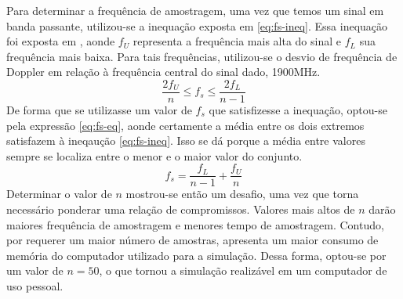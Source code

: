 \documentclass[journal,11pt,twocolumn]{IEEEtran}
\begin{document}
Para determinar a frequência de amostragem, uma vez que temos um sinal em banda passante, utilizou-se a inequação exposta em \ref{eq:fs-ineq}. Essa inequação foi exposta em \cite{bandpass}, aonde $f_{U}$ representa a frequência mais alta do sinal e $f_{L}$ sua frequência mais baixa. Para tais frequências, utilizou-se o desvio de frequência de Doppler em relação à frequência central do sinal dado, 1900MHz.
\begin{equation}
    \frac{2f_{U}}{n} \leq f_{s}\leq \frac{2f_{L}}{n-1}
    \label{eq:fs-ineq}
\end{equation}
De forma que se utilizasse um valor de $f_{s}$ que satisfizesse a inequação, optou-se pela expressão \ref{eq:fs-eq}, aonde certamente a média entre os dois extremos satisfazem à ineqaução \ref{eq:fs-ineq}. Isso se dá porque a média entre valores sempre se localiza entre o menor e o maior valor do conjunto.
\begin{equation}
     f_{s} = \frac{f_{L}}{n-1} + \frac{f_{U}}{n}
    \label{eq:fs-eq}    
\end{equation}
Determinar o valor de $n$ mostrou-se então um desafio, uma vez que torna necessário ponderar uma relação de compromissos. Valores mais altos de $n$ darão maiores frequência de amostragem e menores tempo de amostragem. Contudo, por requerer um maior número de amostras, apresenta um maior consumo de memória do computador utilizado para a simulação. Dessa forma, optou-se por um valor de $n=50$, o que tornou a simulação realizável em um computador de uso pessoal.
\end{document}
